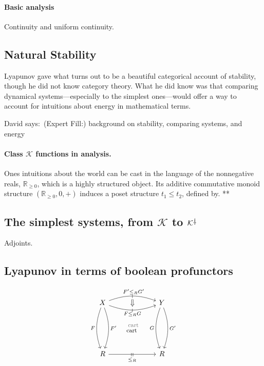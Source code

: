 \documentclass[11pt, one side, article]{memoir}
\theoremstyle{definition}
\theoremstyle{plain}
\newcommand{\cat}[1]{\mathcal{#1}}%
\newcommand{\tn}[1]{\textnormal{#1}}
\newcommand{\rr}{\mathbb{R}}
\newcommand{\dnote}[1]{{\color{blue}David says:}~#1\quad{\color{blue}$\lozenge$}}
\newcommand{\rrnon}{\rr_{\geq 0}}
\newcommand{\K}{\cat{K}}
\newcommand{\Kdag}[1][0]{\K^{\rotatebox{180}{$\dagger$}}}
\begin{document}
\paragraph{Basic analysis}

Continuity and uniform continuity.

\subsection{Natural Stability}

Lyapunov gave what turns out to be a beautiful categorical account of stability, though he did not know category theory. What he did know was that comparing dynamical systems---especially to the simplest ones---would offer a way to account for intuitions about energy in mathematical terms.

\dnote{(Expert Fill:) background on stability, comparing systems, and energy}


\paragraph{Class $\K$ functions in analysis.}

Ones intuitions about the world can be cast in the language of the nonnegative reals, $\rrnon$, which is a highly structured object. Its additive commutative monoid structure $(\rrnon,0,+)$ induces a poset structure $t_1\leq t_2$, defined by. **

\subsection{The simplest systems, from $\K$ to $\Kdag$}

Adjoints.

\subsection{Lyapunov in terms of boolean profunctors}

\[
\begin{tikzcd}[row sep=2cm, column sep=2.3cm]
	X 
		\ar[d, bend left=20pt, "F'"]
		\ar[d, bend right=20pt, "F"']
		\ar[r, bend left=20pt, "\shortmid"{marking}", "~F'\leq_R G'", ""' name=C1]
		\ar[r, bend right=20pt, "\shortmid"{marking}", "F\leq_R G"' name=C2', "" name=C2]
	& 
	Y 
		\ar[d, bend left=20pt, "G'"]
		\ar[d, bend right=20pt, "G"'] 
	\\
	R 
		\ar[r, "\shortmid\shortmid"{marking}", "\leq_R"' below=2pt, "" name=R]
	&
	R
	\ar[from=C1, to=C2, Rightarrow, ]
	\ar[from=C1, to=R, right, phantom, "\color{gray}\footnotesize~\tn{cart}"]
	\ar[from=C2, to=R, right, phantom, 
		"\footnotesize
		\!
		\text{cart}"
		]
\end{tikzcd}
\]
\end{document}
